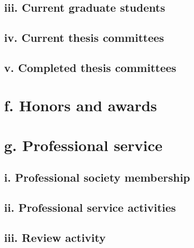 \documentclass{article}
\begin{document}


\subsection*{iii. Current graduate students}



\subsection*{iv. Current thesis committees}



\subsection*{v. Completed thesis committees}





\section*{f. Honors and awards}




\section*{g. Professional service}

\subsection*{i. Professional society membership}



\subsection*{ii. Professional service activities}



\subsection*{iii. Review activity}
\end{document}
